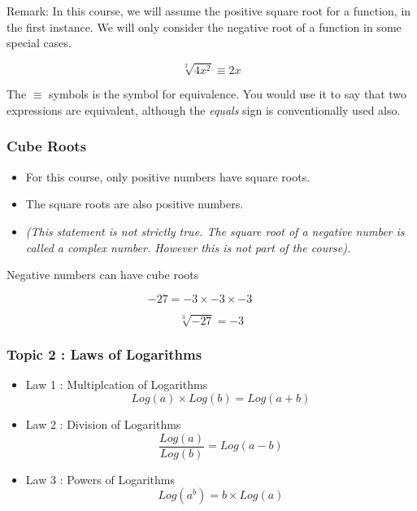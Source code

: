 \begin{itemize}
\begin{frame}
	Remark: In this course, we will assume the positive square root for a function, in the first instance.
	We will only consider the negative root of a function in some special cases.
	
	
	\[ \sqrt[2]{4x^2} \equiv 2x \]
	
	The $\equiv$ symbols is the symbol for equivalence. You would use it to say that two expressions are equivalent, although the \textit{equals} sign is conventionally used also.
	
\end{frame}
\begin{frame}
	\frametitle{Cube Roots}
		\begin{itemize}
		\item For this course, only positive numbers have square roots. 
		\item The square roots are also positive numbers. 
		\item \textit{(This statement is not strictly true. The square root of a negative number is called a complex number. However this is not part of the course).}
	\end{itemize}
\end{frame}
\begin{frame}
	Negative numbers can have cube roots
	
	{
		\Large
		\[ -27 = -3 \times -3 \times -3 \qquad \]
		
		\[ \sqrt[3]{-27} = -3 \]
	}
\end{frame}

\begin{frame}
	\frametitle{ Topic 2 : Laws of Logarithms}
	\Large
	\begin{itemize}
		\item Law 1 : Multiplcation of Logarithms
		\[ Log(a) \times Log(b) = Log(a+b) \]
		\item Law 2 : Division of Logarithms
		\[ \frac{Log(a)}{Log(b)} = Log(a-b) \]
		\item Law 3 : Powers of Logarithms
		\[ Log(a^b) = b \times Log(a) \]
	\end{itemize}
	
	
	
\end{frame}


\end{itemize}
